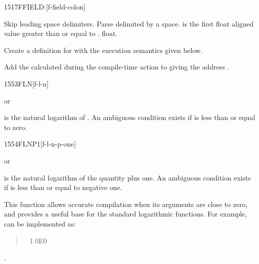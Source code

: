 \vspace*{-1ex}
\begin{worddef}{1517}{FFIELD:}[f-field-colon]%
\item {}

	Skip leading space delimiters. Parse  delimited by
	a space.  is the first float aligned value greater
	than or equal to .   float.

	Create a definition for  with the execution semantics
	given below.

\execute[name]

	Add the  calculated during the compile-time action to
	 giving the address .

\end{worddef}

\vspace*{-1ex}
\begin{worddef}{1553}{FLN}[f-l-n]
\item {} or

	 is the natural logarithm of . An ambiguous
	condition exists if  is less than or equal to zero.
\end{worddef}

\enlargethispage{8ex}\vspace*{-1ex}
\begin{worddef}{1554}{FLNP1}[f-l-n-p-one]
\item {} or

	 is the natural logarithm of the quantity 
	plus one. An ambiguous condition exists if  is less
	than or equal to negative one.

	\begin{rationale} %
		This function allows accurate compilation when its arguments
		are close to zero, and provides a useful base for the standard
		logarithmic functions. For example,  can be
		implemented as:

		\begin{quote}\ttfamily
			\word[core]{:}  ~
				1.0E0  ~ 
			\word[core]{;}
		\end{quote}
	\see {}.
	\end{rationale}
\end{worddef}

